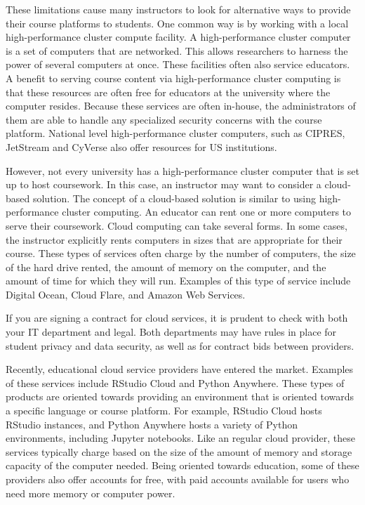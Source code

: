 These limitations cause many instructors to look for alternative ways to provide their course platforms to students.
One common way is by working with a local high-performance cluster compute facility.
A high-performance cluster computer is a set of computers that are networked. 
This allows researchers to harness the power of several computers at once.
These facilities often also service educators.
A benefit to serving course content via high-performance cluster computing is that these resources are often free for educators at the university where the computer resides.
Because these services are often in-house, the administrators of them are able to handle any specialized security concerns with the course platform.
National level high-performance cluster computers, such as CIPRES, JetStream and CyVerse also offer resources for US institutions.

However, not every university has a high-performance cluster computer that is set up to host coursework. 
In this case, an instructor may want to consider a cloud-based solution. 
The concept of a cloud-based solution is similar to using high-performance cluster computing.
An educator can rent one or more computers to serve their coursework. 
Cloud computing can take several forms. 
In some cases, the instructor explicitly rents computers in sizes that are appropriate for their course.
These types of services often charge by the number of computers, the size of the hard drive rented, the amount of memory on the computer, and the amount of time for which they will run.
Examples of this type of service include Digital Ocean, Cloud Flare, and Amazon Web Services.

{\begin{framed}
If you are signing a contract for cloud services, it is prudent to check with both your IT department and legal. 
Both departments may have rules in place for student privacy and data security, as well as for contract bids between providers.
\end{framed}}

Recently, educational cloud service providers have entered the market.
Examples of these services include RStudio Cloud and Python Anywhere. 
These types of products are oriented towards providing an environment that is oriented towards a specific language or course platform. 
For example, RStudio Cloud hosts RStudio instances, and Python Anywhere hosts a variety of Python environments, including Jupyter notebooks. 
Like an regular cloud provider, these services typically charge based on the size of the amount of memory and storage capacity of the computer needed.
Being oriented towards education, some of these providers also offer accounts for free, with paid accounts available for users who need more memory or computer power.






